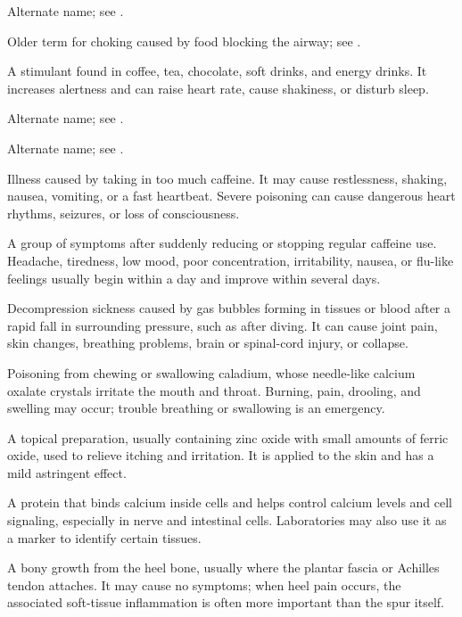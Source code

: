  Alternate name; see .

 Older term for choking caused by food blocking the airway; see .

 A stimulant found in coffee, tea, chocolate, soft drinks, and energy drinks. It increases alertness and can raise heart rate, cause shakiness, or disturb sleep.

 Alternate name; see .

 Alternate name; see .

 Illness caused by taking in too much caffeine.
It may cause restlessness, shaking, nausea, vomiting, or a fast heartbeat.
Severe poisoning can cause dangerous heart rhythms, seizures, or loss of
consciousness.

 A group of symptoms after suddenly reducing or stopping regular caffeine use. Headache, tiredness, low mood, poor concentration, irritability, nausea, or flu-like feelings usually begin within a day and improve within several days.

 Decompression sickness caused by gas bubbles forming in tissues or blood after a rapid fall in surrounding pressure, such as after diving. It can cause joint pain, skin changes, breathing problems, brain or spinal-cord injury, or collapse.

 Poisoning from chewing or swallowing caladium, whose needle-like calcium oxalate crystals irritate the mouth and throat. Burning, pain, drooling, and swelling may occur; trouble breathing or swallowing is an emergency.

 A topical preparation, usually containing zinc oxide with small amounts of ferric oxide, used to relieve itching and irritation. It is applied to the skin and has a mild astringent effect.

 A protein that binds calcium inside cells and helps control calcium levels and cell signaling, especially in nerve and intestinal cells. Laboratories may also use it as a marker to identify certain tissues.

 A bony growth from the heel bone, usually where the plantar fascia or Achilles tendon attaches. It may cause no symptoms; when heel pain occurs, the associated soft-tissue inflammation is often more important than the spur itself.

